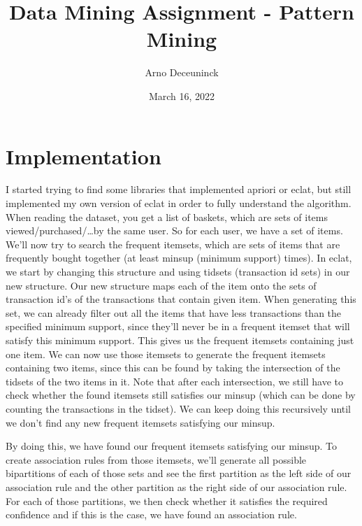 \documentclass{article}
\title{Data Mining Assignment - Pattern Mining}
\author{Arno Deceuninck}
\date{March 16, 2022}
\begin{document}
    \maketitle


    \section{Implementation}\label{sec:implementation}

    I started trying to find some libraries that implemented apriori or eclat, but still implemented my own version of eclat in order to fully understand the algorithm.
    When reading the dataset, you get a list of baskets, which are sets of items viewed/purchased/\ldots by the same user.
    So for each user, we have a set of items.
    We'll now try to search the frequent itemsets, which are sets of items that are frequently bought together (at least minsup (minimum support) times).
    In eclat, we start by changing this structure and using tidsets (transaction id sets) in our new structure.
    Our new structure maps each of the item onto the sets of transaction id's of the transactions that contain given item.
    When generating this set, we can already filter out all the items that have less transactions than the specified minimum support, since they'll never be in a frequent itemset that will satisfy this minimum support.
    This gives us the frequent itemsets containing just one item.
    We can now use those itemsets to generate the frequent itemsets containing two items, since this can be found by taking the intersection of the tidsets of the two items in it.
    Note that after each intersection, we still have to check whether the found itemsets still satisfies our minsup (which can be done by counting the transactions in the tidset).
    We can keep doing this recursively until we don't find any new frequent itemsets satisfying our minsup.

    By doing this, we have found our frequent itemsets satisfying our minsup.
    To create association rules from those itemsets, we'll generate all possible bipartitions of each of those sets and see the first partition as the left side of our association rule and the other partition as the right side of our association rule.
    For each of those partitions, we then check whether it satisfies the required confidence and if this is the case, we have found an association rule.
\end{document}
